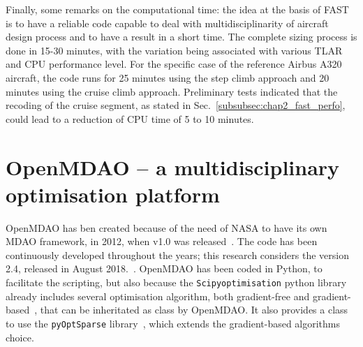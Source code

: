 Finally, some remarks on the computational time: the idea at the basis of FAST is to have a reliable code capable to deal with multidisciplinarity of aircraft design process and to have a result in a short time. 
The complete sizing process is done in 15-30 minutes, with the variation being associated with various TLAR and CPU performance level.
For the specific case of the reference Airbus A320 aircraft, the code runs for 25 minutes using the step climb approach and 20 minutes using the cruise climb approach. 
Preliminary tests indicated that the recoding of the cruise segment, as stated in Sec.~\ref{subsubsec:chap2_fast_perfo}, could lead to a reduction of CPU time of 5 to 10 minutes.

\section{OpenMDAO -- a multidisciplinary optimisation platform}
\label{sec:chap2_openmdao_overview}

OpenMDAO has ben created because of the need of NASA to have its own MDAO framework, in 2012, when v1.0 was released~\cite{bib:gray_omdao_2012, bib:gray_omdao_2014}. 
The code has been continuously developed throughout the years; this research considers the version 2.4, released in August 2018.~\cite{bib:openmdao_website}. 
OpenMDAO has been coded in Python, to facilitate the scripting, but also because the \texttt{Scipyoptimisation} python library already includes several optimisation algorithm, both gradient-free and gradient-based~\cite{bib:scipy_2007, bib:scipy_2011}, that can be inheritated as class by OpenMDAO. 
It also provides a class to use the \texttt{pyOptSparse} library~\cite{bib:pyopt}, which extends the gradient-based algorithms choice. 

